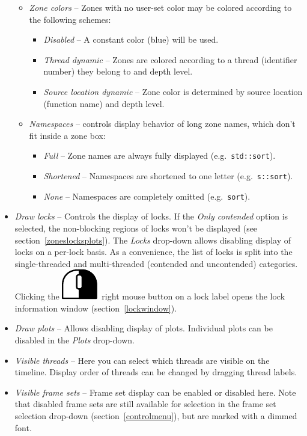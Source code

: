 \documentclass[hidelinks,titlepage,a4paper]{article}
\newcommand{\RMB}{\includegraphics[height=.8\baselineskip]{icons/rmb}}
\begin{document}
\begin{itemize}
\begin{itemize}
\item \emph{\faPalette{} Zone colors} -- Zones with no user-set color may be colored according to the following schemes:
\begin{itemize}
\item \emph{Disabled} -- A constant color (blue) will be used.
\item \emph{Thread dynamic} -- Zones are colored according to a thread (identifier number) they belong to and depth level.
\item \emph{Source location dynamic} -- Zone color is determined by source location (function name) and depth level.
\end{itemize}
\item \emph{\faBoxOpen{} Namespaces} -- controls display behavior of long zone names, which don't fit inside a zone box:
\begin{itemize}
\item \emph{Full} -- Zone names are always fully displayed (e.g.\ \texttt{std::sort}).
\item \emph{Shortened} -- Namespaces are shortened to one letter (e.g.\ \texttt{s::sort}).
\item \emph{None} -- Namespaces are completely omitted (e.g.\ \texttt{sort}).
\end{itemize}
\end{itemize}
\item \emph{\faLock{} Draw locks} -- Controls the display of locks. If the \emph{Only contended} option is selected, the non-blocking regions of locks won't be displayed (see section~\ref{zoneslocksplots}). The \emph{Locks} drop-down allows disabling display of locks on a per-lock basis. As a convenience, the list of locks is split into the single-threaded and multi-threaded (contended and uncontended) categories. Clicking the \RMB{}~right mouse button on a lock label opens the lock information window (section~\ref{lockwindow}).
\item \emph{\faSignature{} Draw plots} -- Allows disabling display of plots. Individual plots can be disabled in the \emph{Plots} drop-down.
\item \emph{\faRandom{} Visible threads} -- Here you can select which threads are visible on the timeline. Display order of threads can be changed by dragging thread labels.
\item \emph{\faImages{} Visible frame sets} -- Frame set display can be enabled or disabled here. Note that disabled frame sets are still available for selection in the frame set selection drop-down (section~\ref{controlmenu}), but are marked with a dimmed font.
\end{itemize}
\end{document}

